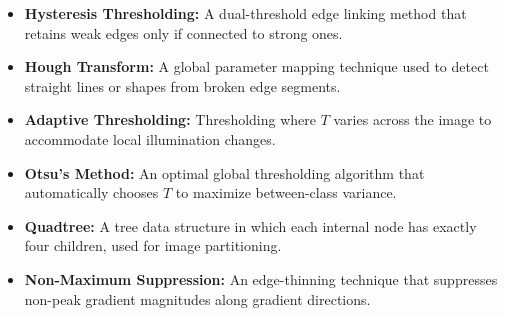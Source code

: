 \documentclass[12pt,a4paper]{article}
\begin{document}
\begin{tcolorbox}[defbox, title={\textbf{One-Line Definitions}}]
\begin{itemize}[leftmargin=*, itemsep=2.5pt, topsep=0pt]
  \item \textbf{Hysteresis Thresholding:} A dual-threshold edge linking method that retains weak edges only if connected to strong ones.
  \item \textbf{Hough Transform:} A global parameter mapping technique used to detect straight lines or shapes from broken edge segments.
  \item \textbf{Adaptive Thresholding:} Thresholding where $T$ varies across the image to accommodate local illumination changes.
  \item \textbf{Otsu's Method:} An optimal global thresholding algorithm that automatically chooses $T$ to maximize between-class variance.
  \item \textbf{Quadtree:} A tree data structure in which each internal node has exactly four children, used for image partitioning.
  \item \textbf{Non-Maximum Suppression:} An edge-thinning technique that suppresses non-peak gradient magnitudes along gradient directions.
\end{itemize}
\end{tcolorbox}
\end{document}
